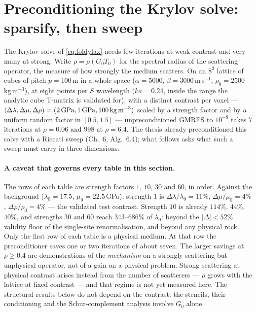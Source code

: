 \documentclass[11pt,a4paper]{article}
\newcommand{\Tz}{T_0}
\newcommand{\Gz}{G_0}
\begin{document}
\section{Preconditioning the Krylov solve: sparsify, then sweep}\label{sec:precon}

The Krylov solve of \eqref{eq:foldylax} needs few iterations at weak contrast and very many at
strong. Write $\rho = \rho(\Gz\Tz)$ for the spectral radius of the scattering operator, the
measure of how strongly the medium scatters. On an $8^3$ lattice of cubes of pitch
$p = 100$\,m in a whole space ($\alpha = 5000$, $\beta = 3000$\,m\,s$^{-1}$,
$\rho_0 = 2500$\,kg\,m$^{-3}$), at eight points per $S$ wavelength ($ka = 0.24$, inside the
range the analytic cube T-matrix is validated for), with a distinct contrast per voxel ---
$(\Delta\lambda, \Delta\mu, \Delta\rho) = (2\,\text{GPa}, 1\,\text{GPa}, 100\,\text{kg\,m}^{-3})$
scaled by a strength factor and by a uniform random factor in $[0.5, 1.5]$ --- unpreconditioned
GMRES to $10^{-8}$ takes $7$ iterations at $\rho = 0.06$ and $998$ at $\rho = 6.4$. The thesis
already preconditioned this solve with a Riccati sweep (Ch.~6, Alg.~6.4); what follows asks
what such a sweep must carry in three dimensions.

\paragraph{A caveat that governs every table in this section.} The rows of each table are
strength factors $1$, $10$, $30$ and $60$, in order. Against the background
($\lambda_0 = 17.5$, $\mu_0 = 22.5$\,GPa), strength $1$ is $\Delta\lambda/\lambda_0 = 11\%$,
$\Delta\mu/\mu_0 = 4\%$, $\Delta\rho/\rho_0 = 4\%$ --- the validated test contrast. Strength $10$
is already $114\%$, $44\%$, $40\%$, and strengths $30$ and $60$ reach $343$--$686\%$ of
$\lambda_0$: beyond the $|\Delta| < 52\%$ validity floor of the single-site renormalisation, and
beyond any physical rock. Only the first row of each table is a physical medium. At that row the
preconditioner saves one or two iterations of about seven. The larger savings at $\rho \ge 0.4$
are demonstrations of the \emph{mechanism} on a strongly scattering but unphysical operator, not
of a gain on a physical problem. Strong scattering at physical contrast arises instead from the
number of scatterers --- $\rho$ grows with the lattice at fixed contrast --- and that regime is
not yet measured here. The structural results below do not depend on the contrast: the stencils,
their conditioning and the Schur-complement analysis involve $\Gz$ alone.
\end{document}
